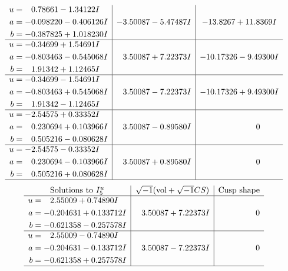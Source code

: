 \documentclass[1p]{elsarticle_modified}
\theoremstyle{definition}
\newcommand{\I}{\sqrt{-1}}
\begin{document}
$$\begin{array}{c|c|c}
\begin{aligned}
u &= \phantom{-}0.78661 - 1.34122 I \\
a &= -0.098220 - 0.406126 I \\
b &= -0.387825 + 1.018230 I\end{aligned}
 & -3.50087 - 5.47487 I & -13.8267 + 11.8369 I \\ \hline\begin{aligned}
u &= -0.34699 + 1.54691 I \\
a &= -0.803463 - 0.545068 I \\
b &= \phantom{-}1.91342 + 1.12465 I\end{aligned}
 & \phantom{-}3.50087 + 7.22373 I & -10.17326 - 9.49300 I \\ \hline\begin{aligned}
u &= -0.34699 - 1.54691 I \\
a &= -0.803463 + 0.545068 I \\
b &= \phantom{-}1.91342 - 1.12465 I\end{aligned}
 & \phantom{-}3.50087 - 7.22373 I & -10.17326 + 9.49300 I \\ \hline\begin{aligned}
u &= -2.54575 + 0.33352 I \\
a &= \phantom{-}0.230694 + 0.103966 I \\
b &= \phantom{-}0.505216 - 0.080628 I\end{aligned}
 & \phantom{-}3.50087 - 0.89580 I & \phantom{-0.000000 } 0 \\ \hline\begin{aligned}
u &= -2.54575 - 0.33352 I \\
a &= \phantom{-}0.230694 - 0.103966 I \\
b &= \phantom{-}0.505216 + 0.080628 I\end{aligned}
 & \phantom{-}3.50087 + 0.89580 I & \phantom{-0.000000 } 0\\
 \hline 
 \end{array}$$\newpage$$\begin{array}{c|c|c}  
\text{Solutions to }I^u_{5}& \I (\text{vol} + \sqrt{-1}CS) & \text{Cusp shape}\\
 \hline 
\begin{aligned}
u &= \phantom{-}2.55009 + 0.74890 I \\
a &= -0.204631 + 0.133712 I \\
b &= -0.621358 - 0.257578 I\end{aligned}
 & \phantom{-}3.50087 + 7.22373 I & \phantom{-0.000000 } 0 \\ \hline\begin{aligned}
u &= \phantom{-}2.55009 - 0.74890 I \\
a &= -0.204631 - 0.133712 I \\
b &= -0.621358 + 0.257578 I\end{aligned}
 & \phantom{-}3.50087 - 7.22373 I & \phantom{-0.000000 } 0\\
 \hline 
 \end{array}$$\newpage\newpage\renewcommand{\arraystretch}{1}
\end{document}
